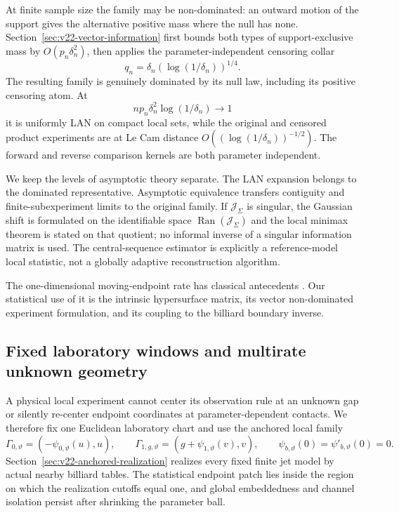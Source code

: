 At finite sample size the family may be non-dominated: an outward motion of
the support gives the alternative positive mass where the null has none.
Section~\ref{sec:v22-vector-information} first bounds both types of
support-exclusive mass by $O(p_n\delta_n^2)$, then applies the
parameter-independent censoring collar
\[
 q_n=\delta_n(\log(1/\delta_n))^{1/4}.
\]
The resulting family is genuinely dominated by its null law, including its
positive censoring atom.  At
\begin{equation}\label{eq:intro-v22-critical}
 np_n\delta_n^2\log(1/\delta_n)\longrightarrow1
\end{equation}
it is uniformly LAN on compact local sets, while the original and censored
product experiments are at Le Cam distance
$O((\log(1/\delta_n))^{-1/2})$.  The forward and reverse comparison kernels
are both parameter independent.

We keep the levels of asymptotic theory separate.  The LAN expansion belongs
to the dominated representative.  Asymptotic equivalence transfers
contiguity and finite-subexperiment limits to the original family.  If
$\mathcal J_\Sigma$ is singular, the Gaussian shift is formulated on the
identifiable space
$\operatorname{Ran}(\mathcal J_\Sigma)$ and the local minimax theorem is
stated on that quotient; no informal inverse of a singular information matrix
is used.  The central-sequence estimator is explicitly a reference-model
local statistic, not a globally adaptive reconstruction algorithm.

The one-dimensional moving-endpoint rate has classical antecedents
\cite{Akahira1975a,Akahira1975b,Smith1985,IbragimovHasminskii,HiranoPorter}.
Our statistical use of it is the intrinsic hypersurface matrix, its vector
non-dominated experiment formulation, and its coupling to the billiard
boundary inverse.

\subsection{Fixed laboratory windows and multirate unknown geometry}

A physical local experiment cannot center its observation rule at an unknown
gap or silently re-center endpoint coordinates at parameter-dependent
contacts.  We therefore fix one Euclidean laboratory chart and use the
anchored local family
\begin{equation}\label{eq:intro-v22-anchored}
 \Gamma_{0,\vartheta}=(-\psi_{0,\vartheta}(u),u),
 \qquad
 \Gamma_{1,g,\vartheta}=(g+\psi_{1,\vartheta}(v),v),
 \qquad
 \psi_{b,\vartheta}(0)=\psi'_{b,\vartheta}(0)=0.
\end{equation}
Section~\ref{sec:v22-anchored-realization} realizes every fixed finite jet
model by actual nearby billiard tables.  The statistical endpoint patch lies
inside the region on which the realization cutoffs equal one, and global
embeddedness and channel isolation persist after shrinking the parameter
ball.


